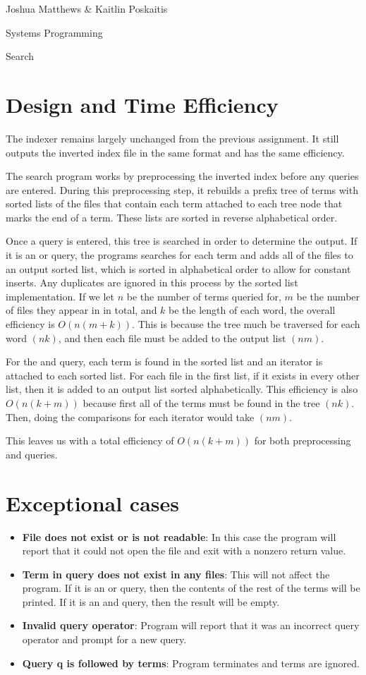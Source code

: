 \documentclass[letterpaper,12pt]{article}
\begin{document}
\noindent Joshua Matthews \& Kaitlin Poskaitis

\noindent Systems Programming

\noindent Search

\section*{Design and Time Efficiency}
The indexer remains largely unchanged from the previous assignment.  It still
outputs the inverted index file in the same format and has the same efficiency.

The search program works by preprocessing the inverted index before
any queries are entered. During this preprocessing step, it rebuilds a prefix
tree of terms with sorted lists of the files that contain each term attached to
each tree node that marks the end of a term.  These lists are sorted in reverse
alphabetical order.

Once a query is entered, this tree is searched in order to determine the output.
If it is an or query, the programs searches for each term and adds all of the
files to an output sorted list, which is sorted in alphabetical order to allow
for constant inserts.  Any duplicates are ignored in this process by the sorted
list implementation.  If we let $n$ be the number of terms queried for, $m$ be the
number of files they appear in in total, and $k$ be the length of each word, the
overall efficiency is $O(n(m+k))$.  This is because the tree much be traversed for
each word $(nk)$, and then each file must be added to the output list $(nm)$.

For the and query, each term is found in the sorted list and an iterator is
attached to each sorted list. For each file in the first list, if it exists in
every other list, then it is added to an output list sorted alphabetically. This
efficiency is also $O(n(k+m))$ because first all of the terms must be found in
the tree $(nk)$.  Then, doing the comparisons for each iterator would take
$(nm)$.

This leaves us with a total efficiency of $O(n(k+m))$ for both preprocessing and
queries.

\section*{Exceptional cases}
\begin{itemize}
    \item {\bf File does not exist or is not readable}: In this case the program
    will report that it could not open the file and exit with a nonzero return
    value.
    \item {\bf Term in query does not exist in any files}: This will not affect
    the program. If it is an or query, then the contents of the rest of the
    terms will be printed. If it is an and query, then the result will be empty.
    \item {\bf Invalid query operator}: Program will report that it was an
    incorrect query operator and prompt for a new query.
    \item {\bf Query q is followed by terms}: Program terminates and terms are
    ignored.
\end{itemize}
\end{document}
